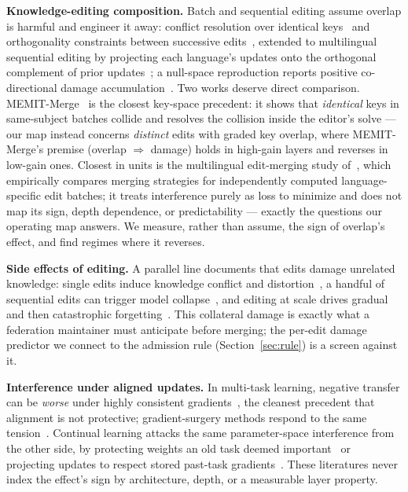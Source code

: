 \documentclass[preprint,12pt]{elsarticle}
\theoremstyle{definition}
\begin{document}
\textbf{Knowledge-editing composition.} Batch and sequential editing assume overlap is
harmful and engineer it away: conflict resolution over identical keys~\cite{memitmerge2025}
and orthogonality constraints between successive edits~\cite{oedit2024,orthoedit2026a,%
orthoedit2026b}, extended to multilingual sequential editing by projecting each
language's updates onto the orthogonal complement of prior updates~\cite{langedit2025};
a null-space reproduction reports positive co-directional damage
accumulation~\cite{alphaeditrepro2026}. Two works deserve direct comparison.
MEMIT-Merge~\cite{memitmerge2025} is the closest key-space precedent: it shows that
\emph{identical} keys in same-subject batches collide and resolves the collision inside
the editor's solve --- our map instead concerns \emph{distinct} edits with graded key
overlap, where MEMIT-Merge's premise (overlap $\Rightarrow$ damage) holds in high-gain
layers and reverses in low-gain ones. Closest in units is the multilingual
edit-merging study of~\cite{mke_merge2026}, which empirically compares merging
strategies for independently computed language-specific edit batches; it treats
interference purely as loss to minimize and does not map its sign, depth dependence,
or predictability --- exactly the questions our operating map answers. We measure,
rather than assume, the sign of overlap's effect, and find regimes where it reverses.

\textbf{Side effects of editing.} A parallel line documents that edits damage unrelated
knowledge: single edits induce knowledge conflict and distortion~\cite{pitfalls2024}, a
handful of sequential edits can trigger model collapse~\cite{butterfly2024}, and editing at
scale drives gradual and then catastrophic forgetting~\cite{seqforget2024}. This collateral
damage is exactly what a federation maintainer must anticipate before merging; the per-edit
damage predictor we connect to the admission rule (Section~\ref{sec:rule}) is a screen
against it.

\textbf{Interference under aligned updates.} In multi-task learning, negative transfer can
be \emph{worse} under highly consistent gradients~\cite{forkmerge2023}, the cleanest
precedent that alignment is not protective; gradient-surgery methods respond to the same
tension~\cite{pcgrad2020,cagrad2021}. Continual learning attacks the same parameter-space
interference from the other side, by protecting weights an old task deemed
important~\cite{ewc2017} or projecting updates to respect stored past-task
gradients~\cite{gem2017}. These literatures never index the effect's sign by architecture,
depth, or a measurable layer property.
\end{document}
